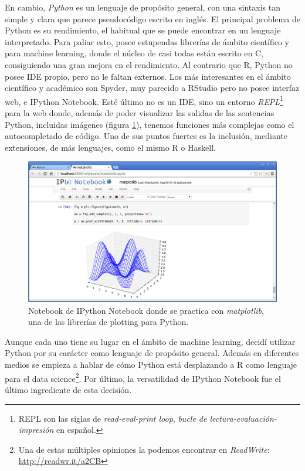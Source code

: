 En cambio, \emph{Python} es un lenguaje de propósito general, con una sintaxis tan simple y clara que parece pseudocódigo escrito en inglés. El principal problema de Python es su rendimiento, el habitual que se puede encontrar en un lenguaje interpretado. Para paliar esto, posee estupendas librerías de ámbito científico y para machine learning, donde el núcleo de casi todas están escrito en C, consiguiendo una gran mejora en el rendimiento. Al contrario que R, Python no posee IDE propio, pero no le faltan externos. Los más interesantes en el ámbito científico y académico son Spyder, muy parecido a RStudio pero no posee interfaz web, e IPython Notebook. Esté último no es un IDE, sino un entorno \emph{REPL}\footnote{REPL son las siglas de \emph{read-eval-print loop}, \emph{bucle de lectura-evaluación-impresión} en español.} para la web donde, además de poder visualizar las salidas de las sentencias Python, incluidas imágenes (figura \ref{fig:4.2}), tenemos funciones más complejas como el autocompletado de código. Uno de sus puntos fuertes es la inclusión, mediante extensiones, de más lenguajes, como el mismo R o Haskell.

\begin{figure}[H]
  \centering
  \includegraphics[width=130mm]{figures/ch_04/ipython_notebook.png}
  \caption{Notebook de IPython Notebook donde se practica con \emph{matplotlib}, una de las librerías de plotting para Python.}
  \label{fig:4.2}
\end{figure}

Aunque cada uno tiene su lugar en el ámbito de machine learning, decidí utilizar Python por su carácter como lenguaje de propósito general. Además en diferentes medios se empieza a hablar de cómo Python está desplazando a R como lenguaje para el data science\footnote{Una de estas múltiples opiniones la podemos encontrar en \emph{ReadWrite}: \url{http://readwr.it/a2CB}}. Por último, la versatilidad de IPython Notebook fue el último ingrediente de esta decisión.

